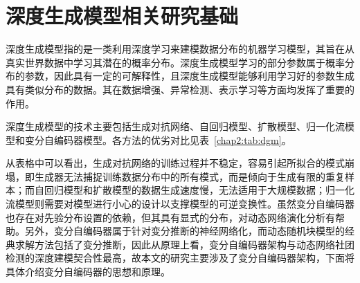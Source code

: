 \section{深度生成模型相关研究基础}

深度生成模型指的是一类利用深度学习来建模数据分布的机器学习模型，其旨在从真实世界数据中学习其潜在的概率分布。深度生成模型学习的部分参数属于概率分布的参数，因此具有一定的可解释性，且深度生成模型能够利用学习好的参数生成具有类似分布的数据。其在数据增强、异常检测、表示学习等方面均发挥了重要的作用\cite{foster2022generative,oussidi2018deep}。

深度生成模型的技术主要包括生成对抗网络\cite{goodfellow2020generative}、自回归模型\cite{you2018graphrnn}、扩散模型\cite{kingma2021variational}、归一化流模型\cite{papamakarios2021normalizing}和变分自编码器模型\cite{pinheiro2021variational}。各方法的优劣对比见表~\ref{chap2:tab:dgm}。

\begin{table}[htbp]
	\caption{深度生成模型各技术对比简表}
	\vspace{0.5em}\centering\wuhao
	\label{chap2:tab:dgm}
\end{table}

从表格中可以看出，生成对抗网络的训练过程并不稳定，容易引起所拟合的模式崩塌，即生成器无法捕捉训练数据分布中的所有模式，而是倾向于生成有限的重复样本；而自回归模型和扩散模型的数据生成速度慢，无法适用于大规模数据；归一化流模型则需要对模型进行小心的设计以支撑模型的可逆变换性。虽然变分自编码器也存在对先验分布设置的依赖，但其具有显式的分布，对动态网络演化分析有帮助。另外，变分自编码器属于针对变分推断的神经网络化，而动态随机块模型的经典求解方法包括了变分推断，因此从原理上看，变分自编码器架构与动态网络社团检测的深度建模契合性最高，故本文的研究主要涉及了变分自编码器架构，下面将具体介绍变分自编码器的思想和原理。

